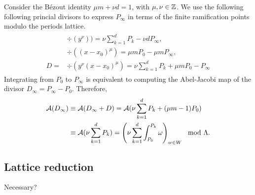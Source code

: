 \documentclass[main.tex]{subfiles}
\begin{document}
    Consider the Bézout identity $\mu m + \nu d = 1$, with $\mu,\nu \in \mathbb{Z}$. We use the following following princial divisors to express $P_{\infty}$ in terms of the finite ramification points
    modulo the periods lattice.
    \begin{align}
     \begin{split}
      &\div(y^{\nu}) ) =  \nu \sum_{k = 1}^d P_k - \nu d P_{\infty},\\
      &\div((x-x_0)^{\mu})  =  \mu m P_0 - \mu m P_{\infty} ,\\
      D  =  & \div(y^{\nu}(x-x_0)^{\mu})  = \nu \sum_{k = 1}^d P_k + \mu m P_0 - P_{\infty}
     \end{split}
    \end{align}
    Integrating from $P_0$ to $P_{\infty}$ is equivalent to computing the Abel-Jacobi map of the divisor $D_{\infty} =  P_{\infty} - P_0 $. Therefore,
    \begin{align}
     \mathcal{A}( D_{\infty} )  & \equiv  \mathcal{A}(D_{\infty} + D)  =  \mathcal{A}(  \nu \sum_{k = 1}^d P_k + (\mu m - 1) P_0  ) \\  & \equiv  \mathcal{A}(  \nu \sum_{k = 1}^d P_k  )
      =   \left( \nu \sum_{k=1}^d \int_{P_0}^{P_k} \omega \right)_{w \in W} \mod \Lambda.
    \end{align}





  \subsection{Lattice reduction}

    Necessary?

\biblio
\end{document}

